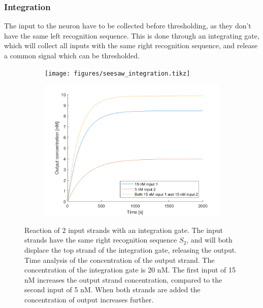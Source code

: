 \subsubsection{Integration}
The input to the neuron have to be collected before thresholding, as they don't have the same left recognition sequence. This is done through an integrating gate, which will collect all inputs with the same right recognition sequence, and release a common signal which can be thresholded.

\begin{figure}[h]
\begin{subfigure}[t]{.49\textwidth}
  \texttt{[image: figures/seesaw\_integration.tikz]}
  \caption{}
  \label{seesaw_integration_reaction}
\end{subfigure}
\hfill
\begin{subfigure}[t]{.49\columnwidth}
  \includegraphics[width=\linewidth]{images/integration.png}
  \caption{}
  \label{seesaw_integration_time}
\end{subfigure}
\caption{ Reaction of 2 input strands with an integration gate. The input strands have the same right recognition sequence $S_2$, and will both displace the top strand of the integration gate, releasing the output.  Time analysis of the concentration of the output strand. The concentration of the integration gate is 20 nM. The first input of 15 nM increases the output strand concentration, compared to the second input of 5 nM. When both strands are added the concentration of output increases further.}
\label{seesaw_integration}
\end{figure}

